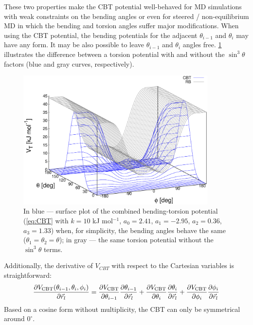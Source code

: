 These two  properties make the CBT potential well-behaved for MD simulations with weak constraints
on the bending angles or even for steered / non-equilibrium MD in which the bending and torsion angles suffer major
modifications.
When using the CBT potential, the bending potentials for the adjacent $\theta_{i-1}$ and $\theta_i$ may have any form.
It may be also possible to leave $\theta_{i-1}$ and $\theta_{i}$ angles free.
\ref{CBT} illustrates the difference between a torsion potential with and without the $\sin^{3}\theta$ factors
(blue and gray curves, respectively).
%
\begin{figure}
\centerline{\includegraphics[width=10cm]{plots/fig-04}}
\caption{In blue --- surface plot of the combined bending-torsion potential
(\ref{eq:CBT} with $k = 10$ kJ mol$^{-1}$, $a_0=2.41$, $a_1=-2.95$, $a_2=0.36$, $a_3=1.33$)
when, for simplicity, the bending angles behave the same ($\theta_1=\theta_2=\theta$);
in gray --- the same torsion potential without the $\sin^{3}\theta$ terms.}
\label{CBT}
\end{figure}
%
Additionally, the derivative of $V_{CBT}$ with respect to the Cartesian variables is straightforward:
%
\begin{equation}
\frac{\partial V_{\rm CBT}(\theta_{i-1},\theta_i,\phi_i)} {\partial \vec r_{l}} = \frac{\partial V_{\rm CBT}}{\partial \theta_{i-1}} \frac{\partial \theta_{i-1}}{\partial \vec r_{l}} +
                                                                                  \frac{\partial V_{\rm CBT}}{\partial \theta_{i  }} \frac{\partial \theta_{i  }}{\partial \vec r_{l}} +
                                                                                  \frac{\partial V_{\rm CBT}}{\partial \phi_{i    }} \frac{\partial \phi_{i    }}{\partial \vec r_{l}}
\label{eq:force_cbt}
\end{equation}
%
Based on a cosine form without multiplicity, the CBT can only be symmetrical around $0^{\circ}$.
